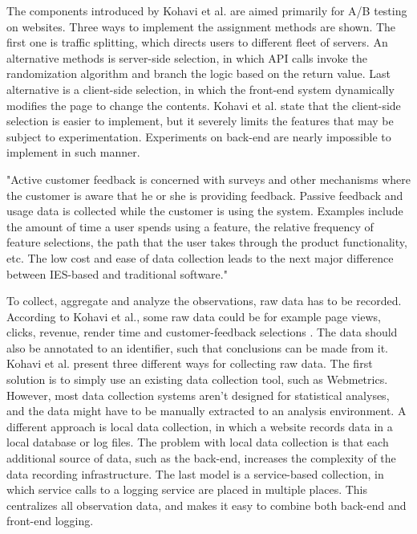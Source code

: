 \documentclass[english]{tktltiki2}
\theoremstyle{definition}
\theoremstyle{remark}
\begin{document}
The components introduced by Kohavi et al. are aimed primarily for A/B testing on websites. Three ways to implement the assignment methods are shown. The first one is traffic splitting, which directs users to different fleet of servers. An alternative methods is server-side selection, in which API calls invoke the randomization algorithm and branch the logic based on the return value. Last alternative is a client-side selection, in which the front-end system dynamically modifies the page to change the contents. Kohavi et al. state that the client-side selection is easier to implement, but it severely limits the features that may be subject to experimentation. Experiments on back-end are nearly impossible to implement in such manner.

"Active customer feedback is concerned with surveys and other mechanisms where the customer is aware that he or she is providing feedback. Passive feedback and usage data is collected while the customer is using the system. Examples include the amount of time a user spends using a feature, the relative frequency of feature selections, the path that the user takes through the product functionality, etc. The low cost and ease of data collection leads to the next major difference between IES-based and traditional software." \cite{bosch2012building}


To collect, aggregate and analyze the observations, raw data has to be recorded. According to Kohavi et al., some raw data could be for example page views, clicks, revenue, render time and customer-feedback selections \cite{kohavi2007practical}. The data should also be annotated to an identifier, such that conclusions can be made from it. Kohavi et al. present three different ways for collecting raw data. The first solution is to simply use an existing data collection tool, such as Webmetrics. However, most data collection systems aren't designed for statistical analyses, and the data might have to be manually extracted to an analysis environment. A different approach is local data collection, in which a website records data in a local database or log files. The problem with local data collection is that each additional source of data, such as the back-end, increases the complexity of the data recording infrastructure. The last model is a service-based collection, in which service calls to a logging service are placed in multiple places. This centralizes all observation data, and makes it easy to combine both back-end and front-end logging.  
\end{document}
